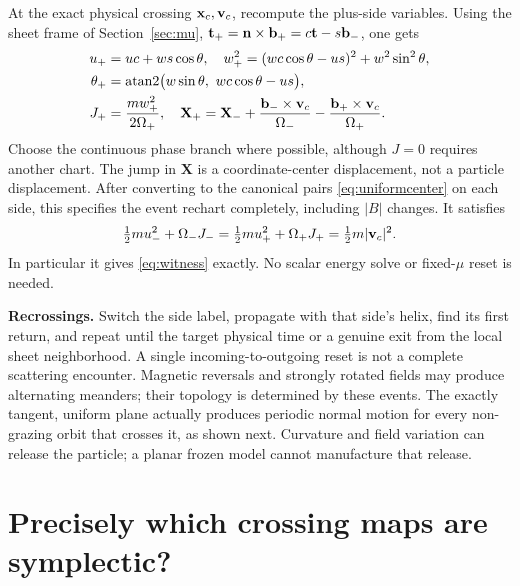 \documentclass[10pt,a4paper]{article}
\newcommand{\X}{\mathbf X}\newcommand{\n}{\mathbf n}
\begin{document}
At the exact physical crossing $\mathbf x_c,\mathbf v_c$, recompute the plus-side variables. Using the sheet frame of Section~\ref{sec:mu}, $\mathbf t_+=\n\times\bunit_+=c\mathbf t-s\bunit_-$, one gets
\begin{align}\label{eq:fullreset}
 u_+&=uc+ws\cos\theta,\quad
 w_+^2=(wc\cos\theta-us)^2+w^2\sin^2\theta,\\
 \theta_+&=\operatorname{atan2}\bigl(w\sin\theta,\ wc\cos\theta-us\bigr),\\
 J_+&=\frac{m w_+^2}{2\Omega_+},\quad
 \X_+=\X_-+\frac{\bunit_-\times\v_c}{\Omega_-}
                      -\frac{\bunit_+\times\v_c}{\Omega_+}.
\end{align}
Choose the continuous phase branch where possible, although $J=0$ requires another chart. The jump in $\X$ is a coordinate-center displacement, not a particle displacement. After converting to the canonical pairs \eqref{eq:uniformcenter} on each side, this specifies the event rechart completely, including $|B|$ changes. It satisfies
\begin{equation}
 \tfrac12m u_-^2+\Omega_-J_-=\tfrac12m u_+^2+\Omega_+J_+=\tfrac12m|\mathbf v_c|^2.
\end{equation}
In particular it gives \eqref{eq:witness} exactly. No scalar energy solve or fixed-$\mu$ reset is needed.

\textbf{Recrossings.} Switch the side label, propagate with that side's helix, find its first return, and repeat until the target physical time or a genuine exit from the local sheet neighborhood. A single incoming-to-outgoing reset is not a complete scattering encounter. Magnetic reversals and strongly rotated fields may produce alternating meanders; their topology is determined by these events. The exactly tangent, uniform plane actually produces periodic normal motion for every non-grazing orbit that crosses it, as shown next. Curvature and field variation can release the particle; a planar frozen model cannot manufacture that release.

\section{Precisely which crossing maps are symplectic?}
\label{sec:sympl}
\end{document}
